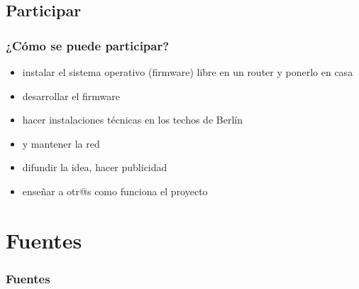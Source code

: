 \documentclass[12pt, xcolor=table]{beamer}
\begin{document}
\begin{comment}
\begin{frame}
  \frametitle{¿Para qué se puede usar la red?}
  \begin{itemize}
    \item obtener acceso a Internet (sobre todo en casos, en los que está difícil con los proveedores de servicios Internet convencionales)
    \item prestar y usar servicios locales
      \begin{itemize}
        \item telefonear dentro de la red Freifunk
        \item cámara para la observación de pájaros
      \end{itemize}
  \end{itemize}
\end{frame}
\end{comment}

\subsection{Participar}
\begin{frame}
  \frametitle{¿Cómo se puede participar?}
  \begin{itemize}
    \item instalar el sistema operativo (firmware) libre en un router y ponerlo en casa
    \item desarrollar el firmware
    \item hacer instalaciones técnicas en los techos de Berlín
    \item y mantener la red
    \item difundir la idea, hacer publicidad
    \item enseñar a otr@s como funciona el proyecto
  \end{itemize}
\end{frame}

\section{Fuentes}
\begin{frame}
  \frametitle{Fuentes}
  \nocite{*}
  
  
\end{frame}
\end{document}
